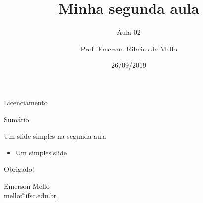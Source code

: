 \documentclass{beamer}
\title{Minha segunda aula}
\subtitle{Aula 02}
\author{Prof. Emerson Ribeiro de Mello}
\institute{%
\href{mello@ifsc.edu.br}{mello@ifsc.edu.br}%
}%
\date{26/09/2019}
\begin{document}
\begin{frame}[plain]
    \titlepage
\end{frame}

\begin{frame}{Licenciamento}
    \licenciamentoLivre
\end{frame}

\begin{frame}{Sumário}
    \tableofcontents
\end{frame}


\begin{frame}{Um slide simples na segunda aula}
\begin{itemize}
    \item Um simples slide
\end{itemize}
\end{frame}


\begin{frame}{}
\vspace{2cm}
    \begin{center}
        \huge Obrigado!
    \end{center}
    \vspace{2cm}
    \begin{flushright}
    Emerson Mello \\ \url{mello@ifsc.edu.br}
    \end{flushright}
\end{frame}
\end{document}
